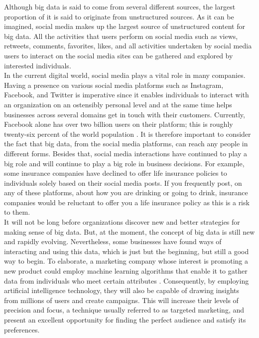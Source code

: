 \documentclass[sigconf]{acmart}
\begin{document}
Although big data is said to come from several different sources, the largest proportion of it is said to originate from unstructured sources. As it can be imagined, social media makes up the largest source of unstructured content for big data. All the activities that users perform on social media such as views, retweets, comments, favorites, likes, and all activities undertaken by social media users to interact on the social media sites can be gathered and explored by interested individuals. \\
In the current digital world, social media plays a vital role in many companies. Having a presence on various social media platforms such as Instagram, Facebook, and Twitter is imperative since it enables individuals to interact with an organization on an ostensibly personal level and at the same time helps businesses across several domains get in touch with their customers. Currently, Facebook alone has over two billion users on their platform; this is roughly twenty-six percent of the world population \cite{Geer2017}. It is therefore important to consider the fact that big data, from the social media platforms, can reach any people in different forms. Besides that, social media interactions have continued to play a big role and will continue to play a big role in business decisions. For example, some insurance companies have declined to offer life insurance policies to individuals solely based on their social media posts. If you frequently post, on any of these platforms, about how you are drinking or going to drink, insurance companies would be reluctant to offer you a life insurance policy as this is a risk to them. \\
It will not be long before organizations discover new and better strategies for making sense of big data. But, at the moment, the concept of big data is still new and rapidly evolving. Nevertheless, some businesses have found ways of interacting and using this data, which is just but the beginning, but still a good way to begin. To elaborate, a marketing company whose interest is promoting a new product could employ machine learning algorithms that enable it to gather data from individuals who meet certain attributes \cite{Geer2017}. Consequently, by employing artificial intelligence technology, they will also be capable of drawing insights from millions of users and create campaigns. This will increase their levels of precision and focus, a technique usually referred to as targeted marketing, and present an excellent opportunity for finding the perfect audience and satisfy its preferences. 
\end{document}
